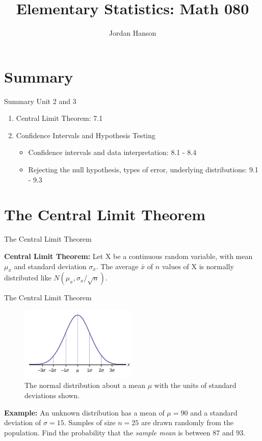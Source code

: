 \documentclass{beamer}
\title{Elementary Statistics: Math 080}
\author{Jordan Hanson}
\institute{Whittier College Department of Physics and Astronomy}
\begin{document}
\maketitle

\section{Summary}

\begin{frame}{Summary}
Unit 2 and 3
\begin{enumerate}
\item Central Limit Theorem: 7.1
\item Confidence Intervals and Hypothesis Testing
\begin{itemize}
\item Confidence intervals and data interpretation: 8.1 - 8.4
\item Rejecting the null hypothesis, types of error, underlying distributions: 9.1 - 9.3
\end{itemize}
\end{enumerate}
\end{frame}

\section{The Central Limit Theorem}

\begin{frame}{The Central Limit Theorem}
\begin{tcolorbox}[colback=orange!10,colframe=orange!100,title=The Central Limit Theorem]
\textbf{Central Limit Theorem:} Let X be a continuous random variable, with mean $\mu_x$ and standard deviation $\sigma_x$.  The average $\bar{x}$ of $n$ values of X is normally distributed like $N(\mu_x,\sigma_x/\sqrt{n})$.
\end{tcolorbox}
\end{frame}

\begin{frame}{The Central Limit Theorem}
\begin{figure}
\centering
\includegraphics[width=0.5\textwidth]{figures/norm.png}
\caption{\label{fig:norm} The normal distribution about a mean $\mu$ with the units of standard deviations shown.}
\end{figure}
\textbf{Example:} An unknown distribution has a mean of $\mu = 90$ and a standard deviation of $\sigma = 15$. Samples of size $n = 25$ are drawn randomly from the population.  Find the probability that the \textit{sample mean} is between 87 and 93. \\ \vspace{1cm}
\end{frame}
\end{document}
